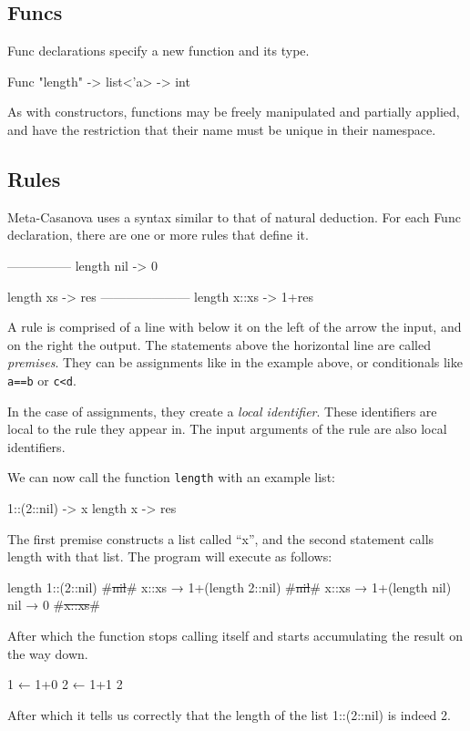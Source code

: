 \subsection{Funcs}
Func declarations specify a new function and its type.

\begin{MC}
Func "length" -> list<'a> -> int
\end{MC}

As with constructors, functions may be freely manipulated and partially applied, and have the restriction that their name must be unique in their namespace.

\subsection{Rules}
Meta-Casanova uses a syntax similar to that of natural deduction.
For each Func declaration, there are one or more rules that define it.

\begin{MC}
---------------
length nil -> 0

length xs -> res
---------------------
length x::xs -> 1+res
\end{MC}

A rule is comprised of a line with below it on the left of the arrow the input, and on the right the output.
The statements above the horizontal line are called \textit{premises}\label{premises}.
They can be assignments like in the example above, or conditionals like \verb|a==b| or \verb|c<d|.

In the case of assignments, they create a \textit{local identifier}.
These identifiers are local to the rule they appear in.
The input arguments of the rule are also local identifiers.

We can now call the function \verb|length| with an example list:

\begin{MC}
  1::(2::nil) -> x
  length x    -> res
\end{MC}

The first premise constructs a list called ``x'', and the second statement calls length with that list.
The program will execute as follows:

\begin{MC}[escapeinside=\#\#]
length 1::(2::nil)
    #\st{nil}#
    x::xs → 1+(length 2::nil)
        #\st{nil}#
        x::xs → 1+(length nil)
            nil → 0
            #\st{x::xs}#
\end{MC}

After which the function stops calling itself and starts accumulating the result on the way down.

\begin{MC}[gobble=2]
          1 ← 1+0
      2 ← 1+1
  2
\end{MC}

After which it tells us correctly that the length of the list 1::(2::nil) is indeed 2.
